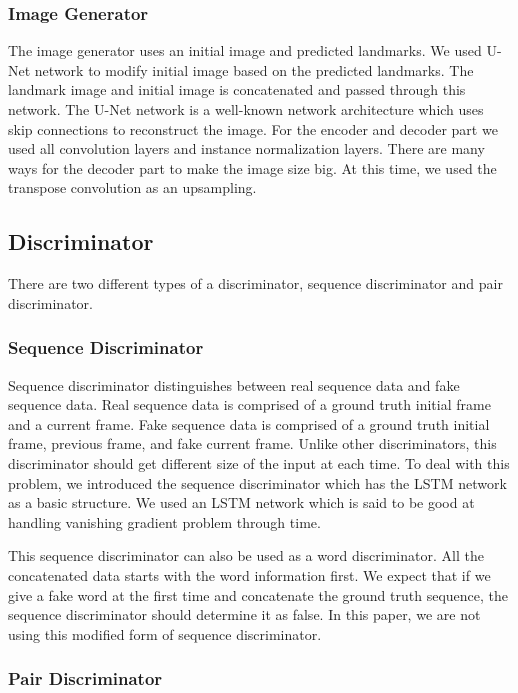 \documentclass[10pt,twocolumn,letterpaper]{article}
\begin{document}
\subsubsection{Image Generator}

The image generator uses an initial image and predicted landmarks. We used U-Net network to modify initial image based on the predicted landmarks. The landmark image and initial image is concatenated and passed through this network. The U-Net network is a well-known network architecture which uses skip connections to reconstruct the image. For the encoder and decoder part we used all convolution layers and instance normalization layers. There are many ways for the decoder part to make the image size big. At this time, we used the transpose convolution as an upsampling.

\subsection{Discriminator}
 There are two different types of a discriminator, sequence discriminator and pair discriminator.
 
\subsubsection{Sequence Discriminator}
Sequence discriminator distinguishes between real sequence data and fake sequence data. Real sequence data is comprised of a ground truth initial frame and a current frame. Fake sequence data is comprised of a ground truth initial frame, previous frame, and fake current frame. Unlike other discriminators, this discriminator should get different size of the input at each time. To deal with this problem, we introduced the sequence discriminator which has the LSTM network as a basic structure. We used an LSTM network which is said to be good at handling vanishing gradient problem through time.

This sequence discriminator can also be used as a word discriminator. All the concatenated data starts with the word information first. We expect that if we give a fake word at the first time and concatenate the ground truth sequence, the sequence discriminator should determine it as false. In this paper, we are not using this modified form of sequence discriminator.

\subsubsection{Pair Discriminator}
\end{document}
